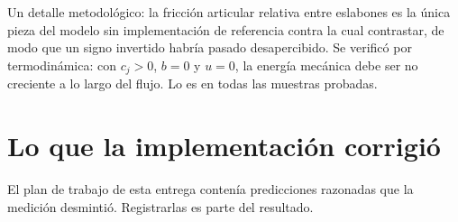 \documentclass[11pt,letterpaper]{article}
\theoremstyle{definition}
\theoremstyle{plain}
\theoremstyle{remark}
\begin{document}
Un detalle metodológico: la fricción articular relativa entre eslabones es la
única pieza del modelo sin implementación de referencia contra la cual
contrastar, de modo que un signo invertido habría pasado desapercibido. Se
verificó por termodinámica: con $c_j>0$, $b=0$ y $u=0$, la energía mecánica debe
ser no creciente a lo largo del flujo. Lo es en todas las muestras probadas.

\section{Lo que la implementación corrigió}
\label{sec:correcciones}

El plan de trabajo de esta entrega contenía predicciones razonadas que la
medición desmintió. Registrarlas es parte del resultado.
\end{document}
